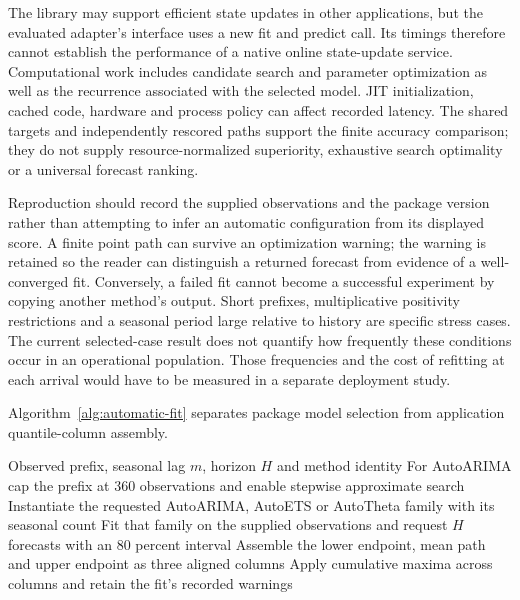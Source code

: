 The library may support efficient state updates in other applications, but the evaluated adapter's interface uses a new fit and predict call. Its timings therefore cannot establish the performance of a native online state-update service. Computational work includes candidate search and parameter optimization as well as the recurrence associated with the selected model. JIT initialization, cached code, hardware and process policy can affect recorded latency. The shared targets and independently rescored paths support the finite accuracy comparison; they do not supply resource-normalized superiority, exhaustive search optimality or a universal forecast ranking.

Reproduction should record the supplied observations and the package version rather than attempting to infer an automatic configuration from its displayed score. A finite point path can survive an optimization warning; the warning is retained so the reader can distinguish a returned forecast from evidence of a well-converged fit. Conversely, a failed fit cannot become a successful experiment by copying another method's output. Short prefixes, multiplicative positivity restrictions and a seasonal period large relative to history are specific stress cases. The current selected-case result does not quantify how frequently these conditions occur in an operational population. Those frequencies and the cost of refitting at each arrival would have to be measured in a separate deployment study.

Algorithm~\ref{alg:automatic-fit} separates package model selection
from application quantile-column assembly.
\begin{algorithm}[htbp]
\caption{Refit each automatic StatsForecast adapter and assemble a shared forecast array at one evaluation origin.}
\label{alg:automatic-fit}
\begin{algorithmic}[1]
\Require Observed prefix, seasonal lag $m$, horizon $H$ and method identity
\State For AutoARIMA cap the prefix at 360 observations and enable stepwise approximate search
\State Instantiate the requested AutoARIMA, AutoETS or AutoTheta family with its seasonal count
\State Fit that family on the supplied observations and request $H$ forecasts with an 80 percent interval
\State Assemble the lower endpoint, mean path and upper endpoint as three aligned columns
\State Apply cumulative maxima across columns and retain the fit's recorded warnings
\end{algorithmic}
\end{algorithm}


